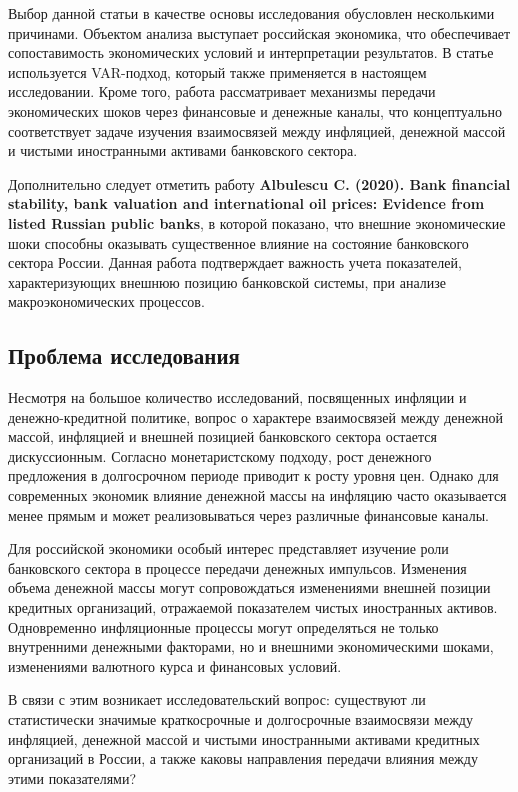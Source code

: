 \documentclass[12pt,a4paper]{article}
\begin{document}
Выбор данной статьи в качестве основы исследования обусловлен несколькими причинами.
Объектом анализа выступает российская экономика, что обеспечивает сопоставимость
экономических условий и интерпретации результатов. В статье используется
VAR-подход, который также применяется в настоящем исследовании. Кроме того, работа
рассматривает механизмы передачи экономических шоков через финансовые и денежные каналы, что
концептуально соответствует задаче изучения взаимосвязей между инфляцией, денежной массой и
чистыми иностранными активами банковского сектора.

Дополнительно следует отметить работу \textbf{Albulescu C. (2020). Bank financial stability,
bank valuation and international oil prices: Evidence from listed Russian public banks}, в
которой показано, что внешние экономические шоки способны оказывать существенное влияние на
состояние банковского сектора России. Данная работа подтверждает важность учета показателей,
характеризующих внешнюю позицию банковской системы, при анализе макроэкономических
процессов.

\subsection{Проблема исследования}
Несмотря на большое количество исследований, посвященных инфляции и денежно-кредитной
политике, вопрос о характере взаимосвязей между денежной массой, инфляцией и внешней
позицией банковского сектора остается дискуссионным. Согласно монетаристскому подходу, рост
денежного предложения в долгосрочном периоде приводит к росту уровня цен. Однако для
современных экономик влияние денежной массы на инфляцию часто оказывается менее прямым и
может реализовываться через различные финансовые каналы.

Для российской экономики особый интерес представляет изучение роли банковского сектора в
процессе передачи денежных импульсов. Изменения объема денежной массы могут сопровождаться
изменениями внешней позиции кредитных организаций, отражаемой показателем чистых иностранных
активов. Одновременно инфляционные процессы могут определяться не только внутренними
денежными факторами, но и внешними экономическими шоками, изменениями валютного курса и
финансовых условий.

В связи с этим возникает исследовательский вопрос: существуют ли статистически значимые
краткосрочные и долгосрочные взаимосвязи между инфляцией, денежной массой и чистыми
иностранными активами кредитных организаций в России, а также каковы направления передачи
влияния между этими показателями?
\end{document}
